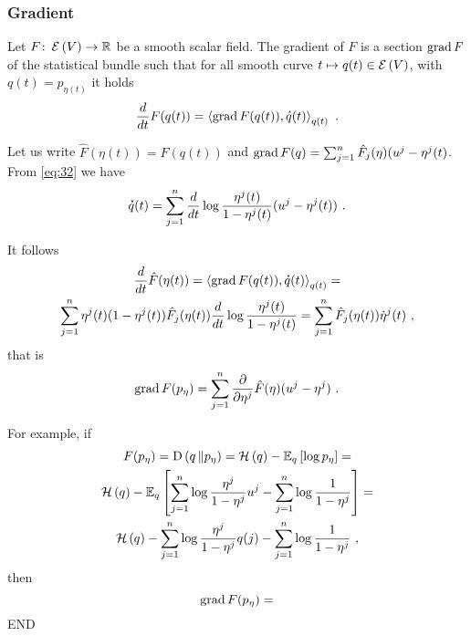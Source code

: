 \documentclass[12pt,a4paper]{amsart}
\begin{document}
\subsubsection{Gradient}
\label{sec:gradient}

Let $F \colon \operatorname{\mathcal E}\left(V\right) \to \mathbb{R}$ be a smooth scalar field. The gradient of $F$ is a section  $\operatorname{grad} F$ of the statistical bundle such that for all smooth curve $t \mapsto q(t) \in \operatorname{\mathcal E}\left(V\right)$, with $q(t) = p_{\eta(t)}$ it holds
\begin{equation}
  \label{eq:gradient}
  \derivby t F(q(t)) = \scalarat {q(t)} {\Grad F(q(t))}{\velocity q(t)} \ .
\end{equation}

Let us write $\hat F(\eta(t)) = F(q(t))$ and $\operatorname{grad} F(q) = \sum_{j=1}^n \hat F_j(\eta) (u^j - \eta^j(t)$. From \cref{eq:32} we have
\begin{equation}
  \label{eq:55}
  \velocity q(t) = \sum_{j=1}^n \derivby t \log \frac {\eta^j(t)}{1 - \eta^j(t)} (u^j - \eta^j(t)) \ .
\end{equation}

It follows
\begin{multline}
  \label{eq:54}
  \derivby t \hat F(\eta(t)) = \scalarat {q(t)} {\Grad F(q(t))}{\velocity q(t)} = \\ \sum_{j=1}^n \eta^j(t)(1-\eta^j(t)) \hat F_j(\eta(t)) \derivby t \log \frac {\eta^j(t)}{1 - \eta^j(t)} = \sum_{j=1}^n \hat F_j(\eta(t)) \dot \eta^j(t) \ , 
\end{multline}
that is
\begin{equation}
  \label{eq:58}
  \Grad F(p_\eta) = \sum_{j=1}^n \pderivby {\eta^j} \hat F(\eta) (u^j - \eta^j) \ .
\end{equation}

For example, if
\begin{multline}
  \label{eq:59}
  F(p_\eta) = \KL {q}{p_\eta} = \entropyof q - \expectat q {\log p_\eta} = \\ \entropyof q - \expectat q {\sum_{j=1}^n \log \frac{\eta^j}{1-\eta^j} u^j - \sum_{j=1}^n \log \frac 1 {1 - \eta^j}} = \\ \entropyof q - \sum_{j=1}^n \log \frac{\eta^j}{1-\eta^j} q(j) - \sum_{j=1}^n \log \frac 1 {1 - \eta^j} \ ,
\end{multline}
then
\begin{equation}
  \label{eq:60}
  \Grad F(p_\eta) = 
\end{equation}
END


% 


\end{document}
